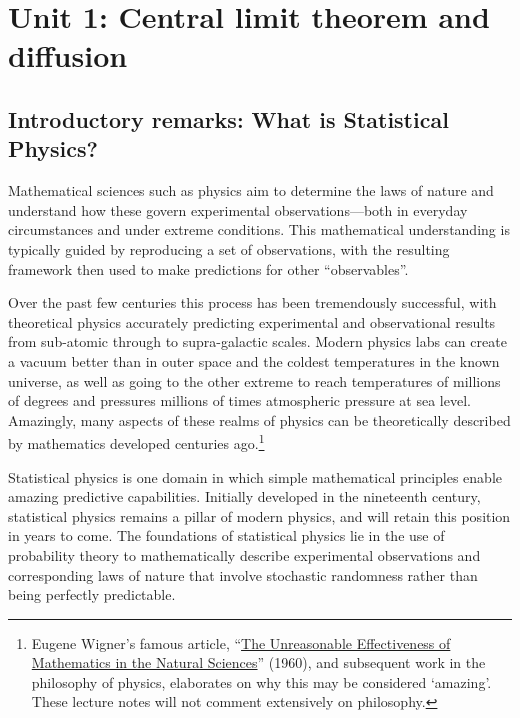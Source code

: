 \renewcommand{\thisunit}{MATH327 Unit 1}
\renewcommand{\moddate}{Last modified 30 Jan.~2022}
\setcounter{section}{1}
\setcounter{subsection}{0}
{}
\section*{Unit 1: Central limit theorem and diffusion}
\subsection*{Introductory remarks: What is Statistical Physics?}
Mathematical sciences such as physics aim to determine the laws of nature and understand how these govern experimental observations---both in everyday circumstances and under extreme conditions.
This mathematical understanding is typically guided by reproducing a set of observations, with the resulting framework then used to make predictions for other ``observables''.

Over the past few centuries this process has been tremendously successful, with theoretical physics accurately predicting experimental and observational results from sub-atomic through to supra-galactic scales.
Modern physics labs can create a vacuum better than in outer space and the coldest temperatures in the known universe, as well as going to the other extreme to reach temperatures of millions of degrees and pressures millions of times atmospheric pressure at sea level.
Amazingly, many aspects of these realms of physics can be theoretically described by mathematics developed centuries ago.\footnote{Eugene Wigner's famous article, ``\href{https://en.wikipedia.org/wiki/The_Unreasonable_Effectiveness_of_Mathematics_in_the_Natural_Sciences}{The Unreasonable Effectiveness of Mathematics in the Natural Sciences}'' (1960), and subsequent work in the philosophy of physics, elaborates on why this may be considered `amazing'.  These lecture notes will not comment extensively on philosophy.}

Statistical physics is one domain in which simple mathematical principles enable amazing predictive capabilities.
Initially developed in the nineteenth century, statistical physics remains a pillar of modern physics, and will retain this position in years to come.
The foundations of statistical physics lie in the use of probability theory to mathematically describe experimental observations and corresponding laws of nature that involve stochastic randomness rather than being perfectly predictable.

